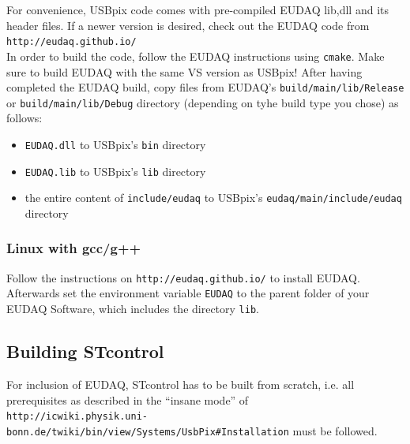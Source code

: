 \documentclass[a4paper,12pt]{article}
\begin{document}
For convenience, USBpix code comes with pre-compiled EUDAQ lib,dll and 
its header files. If a newer version is desired, check out the EUDAQ
code from \\
{\tt http://eudaq.github.io/} \\




In order to build the code, follow the EUDAQ instructions using {\tt cmake}.
Make sure to build EUDAQ with the same VS version as USBpix!
After having completed the EUDAQ build, copy files from EUDAQ's 
{\tt build/main/lib/Release} or {\tt build/main/lib/Debug} directory (depending 
on tyhe build type you chose) as follows:
\begin{itemize}
\item {\tt EUDAQ.dll} to USBpix's {\tt bin} directory
\item {\tt EUDAQ.lib} to USBpix's {\tt lib} directory
\item the entire content of {\tt include/eudaq} to 
    USBpix's {\tt eudaq/main/include/eudaq} directory
\end{itemize}

\subsubsection{Linux with gcc/g++}\label{sec:eudaq_linux}

Follow the instructions on {\tt http://eudaq.github.io/}
to install EUDAQ.
Afterwards set the environment variable {\tt EUDAQ} to the parent folder 
of your EUDAQ Software, which includes the directory {\tt lib}. 

\subsection{Building STcontrol}

For inclusion of EUDAQ, STcontrol has to be built from scratch, i.e.
all prerequisites as described in the ``insane mode'' of\\
{\tt http://icwiki.physik.uni-bonn.de/twiki/bin/view/Systems/UsbPix\#Installation}
must be followed.
\end{document}
